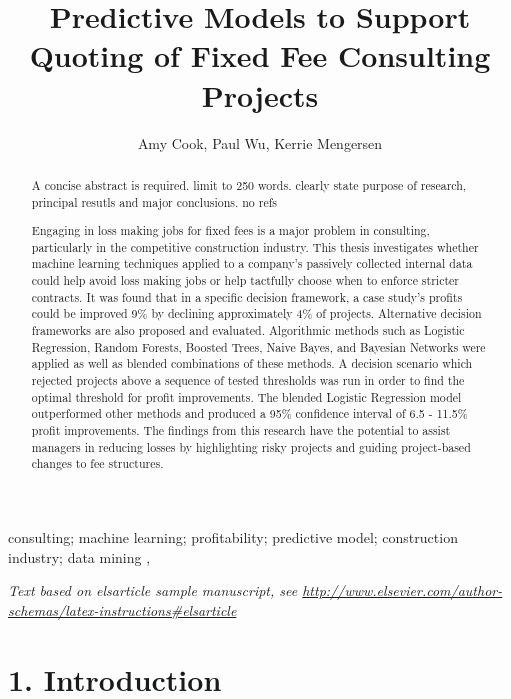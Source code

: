 \documentclass[]{elsarticle} %
\begin{document}
\begin{frontmatter}

  \title{Predictive Models to Support Quoting of Fixed Fee Consulting Projects}
    \author[Queensland University of Technology]{Amy Cook, Paul Wu, Kerrie Mengersen}
      \address[Queensland University of Technology]{School of Mathematical Sciences, George Street, Brisbane, QLD, 4000}
  
  \begin{abstract}
  A concise abstract is required. limit to 250 words. clearly state
  purpose of research, principal resutls and major conclusions. no refs
  
  Engaging in loss making jobs for fixed fees is a major problem in
  consulting, particularly in the competitive construction industry. This
  thesis investigates whether machine learning techniques applied to a
  company's passively collected internal data could help avoid loss making
  jobs or help tactfully choose when to enforce stricter contracts. It was
  found that in a specific decision framework, a case study's profits
  could be improved 9\% by declining approximately 4\% of projects.
  Alternative decision frameworks are also proposed and evaluated.
  Algorithmic methods such as Logistic Regression, Random Forests, Boosted
  Trees, Naive Bayes, and Bayesian Networks were applied as well as
  blended combinations of these methods. A decision scenario which
  rejected projects above a sequence of tested thresholds was run in order
  to find the optimal threshold for profit improvements. The blended
  Logistic Regression model outperformed other methods and produced a 95\%
  confidence interval of 6.5 - 11.5\% profit improvements. The findings
  from this research have the potential to assist managers in reducing
  losses by highlighting risky projects and guiding project-based changes
  to fee structures.
  \end{abstract}
   \begin{keyword} consulting; machine learning; profitability; predictive model;
construction industry; data mining \sep \end{keyword}
 \end{frontmatter}

\emph{Text based on elsarticle sample manuscript, see
\url{http://www.elsevier.com/author-schemas/latex-instructions\#elsarticle}}

\section{1. Introduction}\label{introduction}
\end{document}
